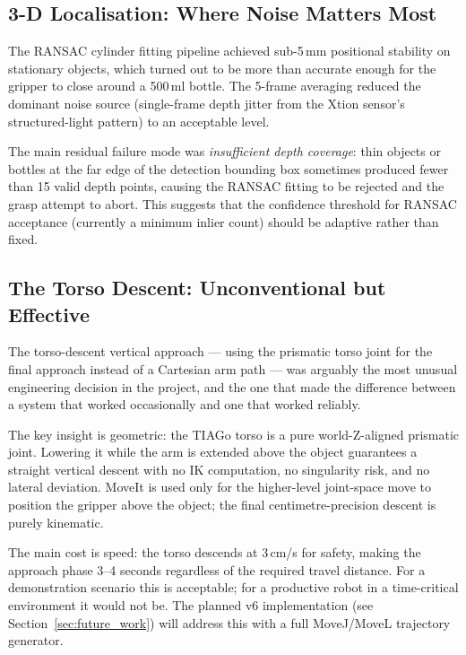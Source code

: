 \subsection{3-D Localisation: Where Noise Matters Most}

The RANSAC cylinder fitting pipeline achieved sub-5\,mm positional stability on stationary
objects, which turned out to be more than accurate enough for the gripper to close around
a 500\,ml bottle.
The 5-frame averaging reduced the dominant noise source (single-frame depth jitter from
the Xtion sensor's structured-light pattern) to an acceptable level.

The main residual failure mode was \emph{insufficient depth coverage}: thin objects or
bottles at the far edge of the detection bounding box sometimes produced fewer than 15
valid depth points, causing the RANSAC fitting to be rejected and the grasp attempt to
abort.
This suggests that the confidence threshold for RANSAC acceptance (currently a minimum
inlier count) should be adaptive rather than fixed.

\subsection{The Torso Descent: Unconventional but Effective}

The torso-descent vertical approach --- using the prismatic torso joint for the final
approach instead of a Cartesian arm path --- was arguably the most unusual engineering
decision in the project, and the one that made the difference between a system that
worked occasionally and one that worked reliably.

The key insight is geometric: the TIAGo torso is a pure world-Z-aligned prismatic joint.
Lowering it while the arm is extended above the object guarantees a straight vertical
descent with no IK computation, no singularity risk, and no lateral deviation.
MoveIt is used only for the higher-level joint-space move to position the gripper above
the object; the final centimetre-precision descent is purely kinematic.

The main cost is speed: the torso descends at 3\,cm/s for safety, making the approach
phase 3--4 seconds regardless of the required travel distance.
For a demonstration scenario this is acceptable; for a productive robot in a time-critical
environment it would not be.
The planned v6 implementation (see Section~\ref{sec:future_work}) will address this with
a full MoveJ/MoveL trajectory generator.

